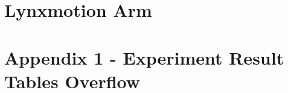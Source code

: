 \documentclass[11.5pt, twoside, a4paper]{article}
\begin{document}
\section{Lynxmotion Arm}




































\section{Appendix 1 - Experiment Result Tables Overflow}
\end{document}
